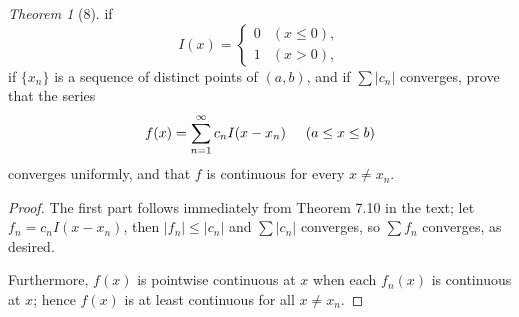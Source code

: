 \documentclass[12pt]{article}
\theoremstyle{remark}
\theoremstyle{named}
\newtheorem*{theorem}{Theorem}
\newcommand{\abs}[1]{|#1|}
\begin{document}
\begin{theorem}[8]
    if \[I(x) = \begin{cases}
        0 & (x \le 0), \\
        1 & (x > 0),
    \end{cases}\]
    if \(\{x_n\}\) is a sequence of distinct points of \((a, b)\), and if \(\sum \abs{c_n}\) converges, prove that the series \[f(x) = \sum_{n = 1}^\infty c_n I(x - x_n) \hspace*{5mm} (a \le x \le b)\] converges uniformly, and that \(f\) is continuous for every \(x \neq x_n\).
\end{theorem}

\begin{proof}
    The first part follows immediately from Theorem 7.10 in the text; let \(f_n = c_n I(x - x_n)\), then \(|f_n| \le \abs{c_n}\) and \(\sum \abs{c_n}\) converges, so \(\sum f_n\) converges, as desired.

    Furthermore, \(f(x)\) is pointwise continuous at \(x\) when each \(f_n(x)\) is continuous at \(x\); hence \(f(x)\) is at least continuous for all \(x \neq x_n\).
\end{proof}
\end{document}

